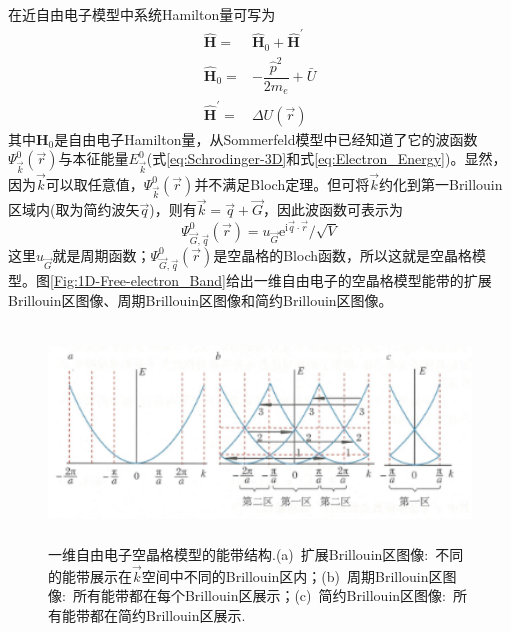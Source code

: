 在近自由电子模型中系统Hamilton量可写为
\begin{equation}
	\begin{aligned}
		\hat{\mathbf{H}}=&\hat{\mathbf{H}}_0+\hat{\mathbf{H}}^{\prime}\\
		\hat{\mathbf{H}}_0=&-\dfrac{\hat p^2}{2m_e}+\bar{U}\\
		\hat{\mathbf{H}}^{\prime}=&\Delta U(\vec r)
	\end{aligned}
	\label{eq:near-free-electron-model}
\end{equation}
其中${\mathbf{H}}_0$是自由电子Hamilton量，从Sommerfeld模型中已经知道了它的波函数$\Psi_{\vec k}^0(\vec r)$与本征能量$E_{\vec k}^0$(式\eqref{eq:Schrodinger-3D}和式\eqref{eq:Electron_Energy})。显然，因为$\vec k$可以取任意值，$\Psi_{\vec k}^0(\vec r)$并不满足Bloch定理。但可将$\vec k$约化到第一Brillouin区域内(取为简约波矢$\vec q$)，则有$\vec k=\vec q+\vec G$，因此波函数可表示为
\begin{equation}
	\Psi_{\vec G,\vec q}^0(\vec r)=u_{\vec G}\mathrm{e}^{\mathrm{i}\vec q\cdot\vec r}/\sqrt{V}
	\label{eq:reduce-G-q}
\end{equation} 
这里$u_{\vec G}$就是周期函数；$\Psi_{\vec G,\vec q}^0(\vec r)$是空晶格的Bloch函数，所以这就是空晶格模型。图\eqref{Fig:1D-Free-electron_Band}给出一维自由电子的空晶格模型能带的扩展Brillouin区图像、周期Brillouin区图像和简约Brillouin区图像。
\begin{figure}[h!]
\centering
\vspace*{-0.10in}
\includegraphics[height=2.25in,width=5.50in,viewport=0 0 90 38,clip]{Figures/1D-Free-electron_Band.png}
\caption{\small \textrm{一维自由电子空晶格模型的能带结构.(a)~扩展Brillouin区图像:~不同的能带展示在$\vec k$空间中不同的Brillouin区内；(b)~周期Brillouin区图像:~所有能带都在每个Brillouin区展示；(c)~简约Brillouin区图像:~所有能带都在简约Brillouin区展示.}}%
\label{Fig:1D-Free-electron_Band}
\end{figure}

